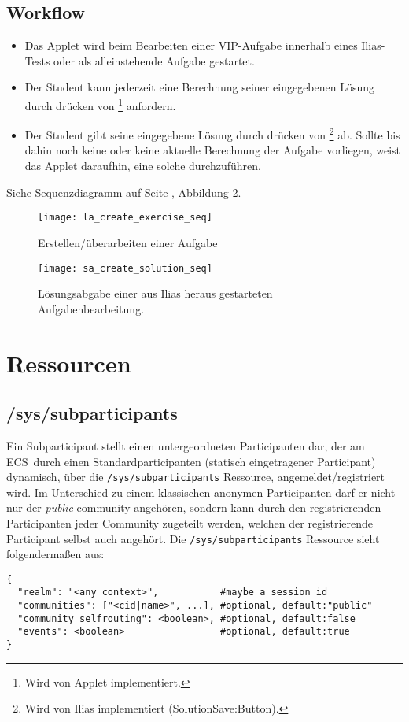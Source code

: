 \documentclass[12pt,a4paper]{article}
\newcommand{\ecs}{ECS}
\newcommand{\button}[1]{\fbox{\texttt{#1}}}
\begin{document}
\subsection{Workflow}
\begin{itemize}
  \item Das Applet wird beim Bearbeiten einer VIP-Aufgabe innerhalb eines Ilias-Tests
    oder als alleinstehende Aufgabe gestartet.
  \item Der Student kann jederzeit eine Berechnung seiner eingegebenen Lösung
    durch drücken von \button{berechnen}\footnote{Wird von Applet
    implementiert.} anfordern.
  \item Der Student gibt seine eingegebene Lösung durch drücken von
    \button{weiter}\footnote{Wird von Ilias implementiert
    (SolutionSave:Button).} ab. Sollte bis dahin noch keine oder keine aktuelle
    Berechnung der Aufgabe vorliegen, weist das Applet daraufhin, eine solche
    durchzuführen.
\end{itemize}
Siehe Sequenzdiagramm auf Seite \pageref{seq:sa_create_solution_seq}, Abbildung \ref{seq:sa_create_solution_seq}.

\begin{figure}[p]
  \texttt{[image: la\_create\_exercise\_seq]}
  \caption{\label{seq:la_create_exercise}Erstellen/überarbeiten einer Aufgabe}
\end{figure}

\begin{figure}[p]
  \texttt{[image: sa\_create\_solution\_seq]}
  \caption{\label{seq:sa_create_solution_seq}Lösungsabgabe einer aus Ilias
  heraus gestarteten Aufgabenbearbeitung.}
\end{figure}

\section{Ressourcen}
\subsection{/sys/subparticipants}
Ein Subparticipant stellt einen untergeordneten Participanten dar, der am \ecs\
durch einen Standardparticipanten (statisch eingetragener Participant)
dynamisch, über die \texttt{/sys/subparticipants} Ressource,
angemeldet/registriert wird. Im Unterschied zu einem klassischen anonymen
Participanten darf er nicht nur der \textit{public} community angehören,
sondern kann durch den registrierenden Participanten jeder Community zugeteilt
werden, welchen der registrierende Participant selbst auch angehört. Die
\texttt{/sys/subparticipants} Ressource sieht folgendermaßen aus:
\begin{verbatim}
{
  "realm": "<any context>",           #maybe a session id
  "communities": ["<cid|name>", ...], #optional, default:"public"
  "community_selfrouting": <boolean>, #optional, default:false
  "events": <boolean>                 #optional, default:true
}
\end{verbatim}
\end{document}
